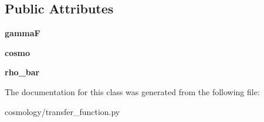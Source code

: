 \subsection*{Public Attributes}
\begin{DoxyCompactItemize}
\item 
\hypertarget{classseren3_1_1cosmology_1_1transfer__function_1_1TophatFilter_a96f9fb5ac27516d3b048319090342499}{
{\bfseries gammaF}}
\label{classseren3_1_1cosmology_1_1transfer__function_1_1TophatFilter_a96f9fb5ac27516d3b048319090342499}

\item 
\hypertarget{classseren3_1_1cosmology_1_1transfer__function_1_1TophatFilter_ad47ad4ae8bfa29039382404637c168d5}{
{\bfseries cosmo}}
\label{classseren3_1_1cosmology_1_1transfer__function_1_1TophatFilter_ad47ad4ae8bfa29039382404637c168d5}

\item 
\hypertarget{classseren3_1_1cosmology_1_1transfer__function_1_1TophatFilter_ad0bc22a4dc1ee44565fa021d3da48c14}{
{\bfseries rho\_\-bar}}
\label{classseren3_1_1cosmology_1_1transfer__function_1_1TophatFilter_ad0bc22a4dc1ee44565fa021d3da48c14}

\end{DoxyCompactItemize}


The documentation for this class was generated from the following file:\begin{DoxyCompactItemize}
\item 
cosmology/transfer\_\-function.py\end{DoxyCompactItemize}
